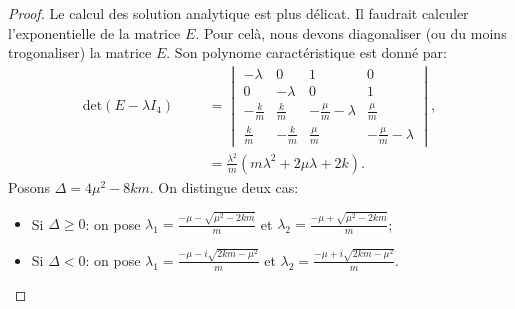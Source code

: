 \begin{proof}

Le calcul des solution analytique est plus délicat. Il faudrait calculer l'exponentielle de la matrice $E$. Pour celà, nous devons diagonaliser (ou du moins trogonaliser) la matrice $E$. Son polynome caractéristique est donné par:
\begin{align*}    
\text{det}(E-\lambda I_4) &&&= \begin{vmatrix}
    -\lambda & 0 & 1 & 0 \\ 0 & -\lambda & 0& 1 \\ -\frac{k}{m} & \frac{k}{m} & -\frac{\mu}{m}-\lambda & \frac{\mu}{m} \\ \frac{k}{m} & -\frac{k}{m} & \frac{\mu}{m} & -\frac{\mu}{m} -\lambda
\end{vmatrix}, \\
    &&&= \frac{\lambda^2}{m} \left( m\lambda^2 + 2\mu\lambda + 2k \right).
\end{align*}
Posons $\Delta = 4\mu^2 - 8km$. On distingue deux cas:
\begin{itemize}
    \item Si $\Delta \geq 0$: on pose $\lambda_1 = \frac{-\mu - \sqrt{\mu^2 - 2km}}{m}$ et $\lambda_2 = \frac{-\mu + \sqrt{\mu^2 - 2km}}{m}$;
    \item Si $\Delta < 0$: on pose $\lambda_1 = \frac{-\mu - i\sqrt{2km - \mu^2}}{m}$ et $\lambda_2 = \frac{-\mu + i\sqrt{2km - \mu^2}}{m}$.
\end{itemize}


\end{proof}
